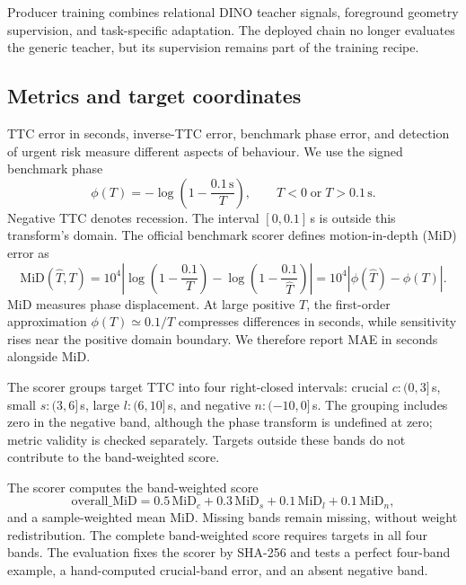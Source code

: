 Producer training combines relational DINO teacher signals, foreground geometry supervision, and task-specific adaptation. The deployed chain no longer evaluates the generic teacher, but its supervision remains part of the training recipe.


\subsection{Metrics and target coordinates}
TTC error in seconds, inverse-TTC error, benchmark phase error, and detection of urgent risk measure different aspects of behaviour. We use the signed benchmark phase
\begin{equation}
\phi(T)=-\log\!\left(1-\frac{0.1\,\mathrm{s}}{T}\right),\qquad T<0\;\text{or}\;T>0.1\,\mathrm{s}.
\end{equation}
Negative TTC denotes recession. The interval $[0,0.1]$\,s is outside this transform's domain. The official benchmark scorer defines motion-in-depth (MiD) error as
\begin{equation}
 \mathrm{MiD}(\widehat T,T)=10^4\left|\log\left(1-\frac{0.1}{T}\right)
 -\log\left(1-\frac{0.1}{\widehat T}\right)\right|
 =10^4|\phi(\widehat T)-\phi(T)|.
\end{equation}
MiD measures phase displacement. At large positive $T$, the first-order approximation $\phi(T)\simeq0.1/T$ compresses differences in seconds, while sensitivity rises near the positive domain boundary. We therefore report MAE in seconds alongside MiD. 

The scorer groups target TTC into four right-closed intervals: crucial $c:(0,3]$\,s, small $s:(3,6]$\,s, large $l:(6,10]$\,s, and negative $n:(-10,0]$\,s. The grouping includes zero in the negative band, although the phase transform is undefined at zero; metric validity is checked separately. Targets outside these bands do not contribute to the band-weighted score.

The scorer computes the band-weighted score
\begin{equation}
 \mathrm{overall\_MiD}=0.5\,\mathrm{MiD}_{c}+0.3\,\mathrm{MiD}_{s}
                     +0.1\,\mathrm{MiD}_{l}+0.1\,\mathrm{MiD}_{n},
\end{equation}
and a sample-weighted mean MiD. Missing bands remain missing, without weight redistribution. The complete band-weighted score requires targets in all four bands. The evaluation fixes the scorer by SHA-256 and tests a perfect four-band example, a hand-computed crucial-band error, and an absent negative band. 

